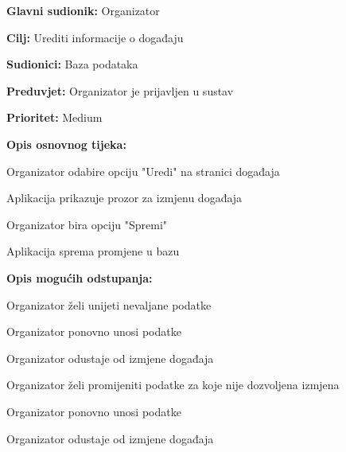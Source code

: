 \noindent {}
	\begin{packed_item}
		
		\item \textbf{Glavni sudionik:} Organizator
		\item \textbf{Cilj:} Urediti informacije o događaju
		\item \textbf{Sudionici:} Baza podataka
		\item \textbf{Preduvjet:} Organizator je prijavljen u sustav
		\item \textbf{Prioritet:} Medium
		\item \textbf{Opis osnovnog tijeka:} 
		
		\item[] \begin{packed_enum}
			
			\item Organizator odabire opciju "Uredi" na stranici događaja
			\item Aplikacija prikazuje prozor za izmjenu događaja
			\item Organizator bira opciju "Spremi"
			\item Aplikacija sprema promjene u bazu
		\end{packed_enum}
	
		\item  \textbf{Opis mogućih odstupanja:}
		\item[] \begin{packed_item}
			
			\item[3.a] Organizator želi unijeti nevaljane podatke
			\item[] \begin{packed_enum}
				\item Organizator ponovno unosi podatke
				\item Organizator odustaje od izmjene događaja
			\end{packed_enum}
		
			\item[3.b] Organizator želi promijeniti podatke za koje nije dozvoljena izmjena
			\item[] \begin{packed_enum}
				\item Organizator ponovno unosi podatke
				\item Organizator odustaje od izmjene događaja
			\end{packed_enum}
			
		\end{packed_item}
	\end{packed_item}
				
